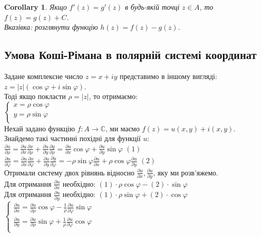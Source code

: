 \documentclass[a4paper, 10pt]{article}
\theoremstyle{theoremdd}
\theoremstyle{theoremdd}
\theoremstyle{theoremdd}
\theoremstyle{theoremdd}
\theoremstyle{theoremdd}
\theoremstyle{theoremdd}
\theoremstyle{theoremdd}
\theoremstyle{theoremdd}
\newtheorem{corollary}[theorem]{Corollary}
\begin{document}
\begin{corollary}
Якщо $f'(z)=g'(z)$ в будь-якій точці $z \in A$, то $f(z)=g(z)+C$.\\
\textit{Вказівка: розглянути функцію $h(z) = f(z)-g(z)$.}
\end{corollary}


	
\subsection{Умова Коші-Рімана в полярній системі координат}
Задане комплексне число $z=x+iy$ представимо в іншому вигляді:\\
$z=|z|(\cos \varphi + i \sin \varphi)$.\\
Тоді якщо покласти $\rho = |z|$, то отримаємо:
\\$\begin{cases}
\displaystyle x = \rho \cos \varphi \\
\displaystyle y = \rho \sin \varphi \\
\end{cases}$\\
Нехай задано функцію $f: A \to \mathbb{C}$, ми маємо $f(z) = u(x,y) + i(x,y)$.\\
Знайдемо такі частинні похідні для функції $u$:\\
$\displaystyle\frac{\partial u}{\partial \rho} = \frac{\partial u}{\partial x}\frac{\partial x}{\partial \rho}+\frac{\partial u}{\partial y}\frac{\partial y}{\partial \rho} = \frac{\partial u}{\partial x} \cos \varphi+\frac{\partial u}{\partial y} \sin \varphi$ $(1)$\\
$\displaystyle\frac{\partial u}{\partial \varphi} = \frac{\partial u}{\partial x}\frac{\partial x}{\partial \varphi}+\frac{\partial u}{\partial y}\frac{\partial y}{\partial \varphi} = -\rho \sin \varphi\frac{\partial u}{\partial x} + \rho \cos \varphi \frac{\partial u}{\partial y}$ $(2)$\\
Отримали систему двох рівнянь відносно $\displaystyle \frac{\partial u}{\partial x}, \frac{\partial u}{\partial y}$, яку ми розв'яжемо.\\
Для отримання $\displaystyle \frac{\partial u}{\partial x}$ необхідно: $(1)\cdot \rho \cos \varphi - (2)\cdot \sin \varphi$\\
Для отримання $\displaystyle \frac{\partial u}{\partial y}$ необхідно: $(1)\cdot \rho \sin \varphi + (2)\cdot \cos \varphi$\\
$\begin{cases}
\displaystyle \frac{\partial u}{\partial x} = \displaystyle \frac{\partial u}{\partial \rho} \cos \varphi - \frac{1}{\rho} \frac{\partial u}{\partial \varphi} \sin \varphi\\
\displaystyle \frac{\partial u}{\partial y} = \displaystyle \frac{\partial u}{\partial \rho} \sin \varphi + \frac{1}{\rho} \frac{\partial u}{\partial \varphi} \cos \varphi\\
\end{cases}$\\
\end{document}
